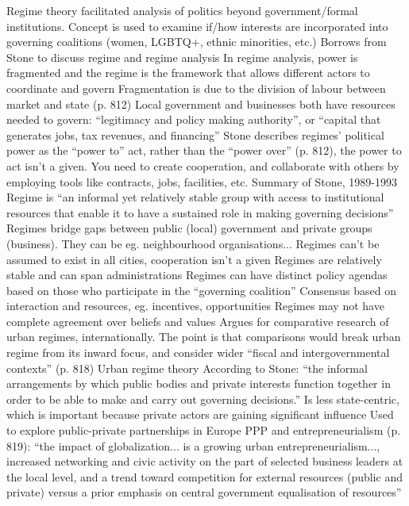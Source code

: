 \documentclass{article}
\begin{document}
\begin{outline}
	\1 Regime theory facilitated analysis of politics beyond government/formal institutions. Concept is used to examine if/how interests are incorporated into governing coalitions (women, LGBTQ+, ethnic minorities, etc.)
	\1 Borrows from Stone to discuss regime and regime analysis 
	\1 In regime analysis, power is fragmented and the regime is the framework that allows different actors to coordinate and govern
		\2 Fragmentation is due to the division of labour between market and state (p. 812)
		\2 Local government and businesses both have resources needed to govern: ``legitimacy and policy making authority'', or ``capital that generates jobs, tax revenues, and financing''
	\1 Stone describes regimes' political power as the ``power to'' act, rather than the ``power over'' (p. 812), the power to act isn't a given. You need to create cooperation, and collaborate with others by employing tools like contracts, jobs, facilities, etc.
	\1 Summary of Stone, 1989-1993
		\2 Regime is ``an informal yet relatively stable group with access to institutional resources that enable it to have a sustained role in making governing decisions''
		\2 Regimes bridge gaps between public (local) government and private groups (business). They can be eg. neighbourhood organisations...
		\2 Regimes can't be assumed to exist in all cities, cooperation isn't a given
		\2 Regimes are relatively stable and can span administrations
		\2 Regimes can have distinct policy agendas based on those who participate in the ``governing coalition''
		\2 Consensus based on interaction and resources, eg. incentives, opportunities
		\2 Regimes may not have complete agreement over beliefs and values
	\1 Argues for comparative research of urban regimes, internationally. The point is that comparisons would break urban regime from its inward focus, and consider wider ``fiscal and intergovernmental contexts'' (p. 818)
	\1 Urban regime theory 
		\2 According to Stone: ``the informal arrangements by which public bodies and private interests function together in order to be able to make and carry out governing decisions.'' 
		\2 Is less state-centric, which is important because private actors are gaining significant influence
		\2 Used to explore public-private partnerships in Europe
	\1 PPP and entrepreneurialism (p. 819): ``the impact of globalization... is a growing urban entrepreneurialism..., increased networking and civic activity on the part of selected business leaders at the local level, and a trend toward competition for external resources (public and private) versus a prior emphasis on central government equalisation of resources''
\end{outline}
\end{document}
